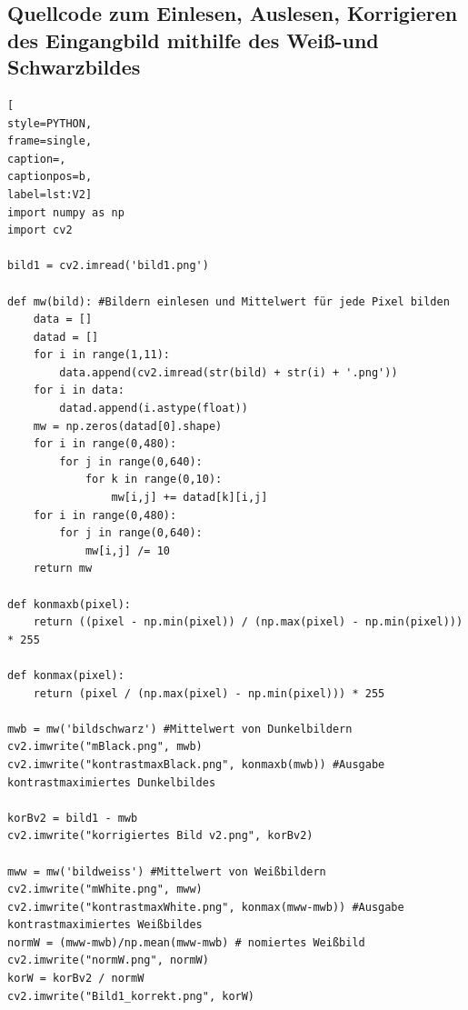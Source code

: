 \documentclass[12pt, oneside, a4paper, \docLanguage]{report}
\begin{document}
\subsection{Quellcode zum Einlesen, Auslesen, Korrigieren des Eingangbild mithilfe des Weiß-und Schwarzbildes}
\label{chap:APPENDIX_SOURCECODE_V3}
\begin{lstlisting}[
style=PYTHON,
frame=single,
caption=,
captionpos=b,
label=lst:V2]
import numpy as np
import cv2

bild1 = cv2.imread('bild1.png')

def mw(bild): #Bildern einlesen und Mittelwert für jede Pixel bilden
    data = []
    datad = []
    for i in range(1,11):
        data.append(cv2.imread(str(bild) + str(i) + '.png'))
    for i in data:
        datad.append(i.astype(float))
    mw = np.zeros(datad[0].shape)
    for i in range(0,480):
        for j in range(0,640):
            for k in range(0,10):
                mw[i,j] += datad[k][i,j]
    for i in range(0,480):
        for j in range(0,640):
            mw[i,j] /= 10
    return mw
    
def konmaxb(pixel):
    return ((pixel - np.min(pixel)) / (np.max(pixel) - np.min(pixel))) * 255

def konmax(pixel):
    return (pixel / (np.max(pixel) - np.min(pixel))) * 255

mwb = mw('bildschwarz') #Mittelwert von Dunkelbildern
cv2.imwrite("mBlack.png", mwb)
cv2.imwrite("kontrastmaxBlack.png", konmaxb(mwb)) #Ausgabe kontrastmaximiertes Dunkelbildes

korBv2 = bild1 - mwb
cv2.imwrite("korrigiertes Bild v2.png", korBv2)

mww = mw('bildweiss') #Mittelwert von Weißbildern
cv2.imwrite("mWhite.png", mww)
cv2.imwrite("kontrastmaxWhite.png", konmax(mww-mwb)) #Ausgabe kontrastmaximiertes Weißbildes
normW = (mww-mwb)/np.mean(mww-mwb) # nomiertes Weißbild
cv2.imwrite("normW.png", normW)
korW = korBv2 / normW
cv2.imwrite("Bild1_korrekt.png", korW)
\end{lstlisting}
\end{document}
